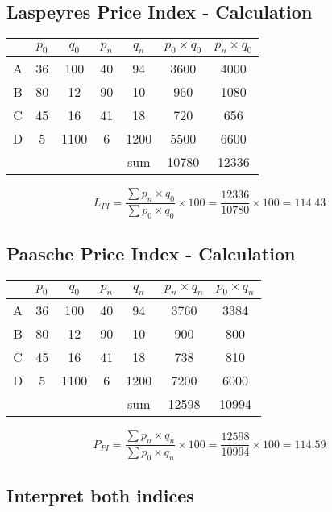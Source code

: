 \documentclass[12pts]{article}
\begin{document}
\subsection*{Laspeyres Price Index - Calculation}
\begin{center}
\begin{tabular}{|c|c|c|c|c|c|c|}
\hline
	&	$p_0$	&	$q_0$	&	$p_n$	&	$q_n$	&	$p_0 \times q_0$	&	$p_n \times q_0$	\\	\hline
A	&	36	&	100	&	40	&	94	&	3600	&	4000	\\	\hline
B	&	80	&	12	&	90	&	10	&	960	&	1080	\\	\hline
C	&	45	&	16	&	41	&	18	&	720	&	656	\\	\hline
D	&	5	&	1100	&	6	&	1200	&	5500	&	6600	\\	\hline \hline
	&		&		&		& sum		&	10780	&	12336	\\	\hline
\end{tabular} 
\end{center}

\[L_{PI} =  \frac{\sum  p_n \times q_0}{\sum  p_0 \times q_0} \times 100 = \frac{12336}{10780}\times 100 = 114.43\]

\subsection*{Paasche Price Index - Calculation}
\begin{center}
\begin{tabular}{|c|c|c|c|c|c|c|}
\hline
	&	$p_0$	&	$q_0$	&	$p_n$	&	$q_n$	&	$p_n \times q_n$	&	$p_0 \times q_n$	\\	\hline
A	&	36	&	100	&	40	&	94	&	3760	&	3384	\\	\hline
B	&	80	&	12	&	90	&	10	&	900	&	800	\\	\hline
C	&	45	&	16	&	41	&	18	&	738	&	810	\\	\hline
D	&	5	&	1100	&	6	&	1200	&	7200	&	6000	\\	\hline \hline
	&		&		&		& sum		&	12598	&	10994	\\	\hline
\end{tabular} 
\end{center}

\[P_{PI} =  \frac{\sum  p_n \times q_n}{\sum  p_0 \times q_n} \times 100 = \frac{12598}{10994}\times 100 = 114.59\]




\subsection*{Interpret both indices}
\end{document}
